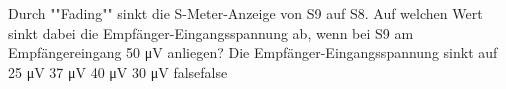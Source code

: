     {Durch ""Fading"" sinkt die S-Meter-Anzeige von S9 auf S8. Auf welchen Wert sinkt dabei die Empfänger-Eingangsspannung ab, wenn bei S9 am Empfängereingang 50 μV anliegen? Die Empfänger-Eingangsspannung sinkt auf}
    {25 μV}
    {37 μV}
    {40 μV}
    {30 μV}
    {false}{false}
